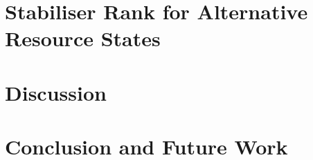\documentclass[11pt,a4paper,twoside]{report}
\theoremstyle{plain}%
\theoremstyle{definition}
\theoremstyle{remark}
\begin{document}
\chapter{Stabiliser Rank for Alternative Resource States}\label{chap:results}

\chapter{Discussion}\label{chap:discussion}

\chapter{Conclusion and Future Work}\label{chap:conclusion}



\end{document}

